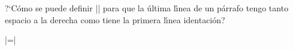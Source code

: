 


\bigskip

\enunciadoS ?`C\'omo se puede definir |\parfillskip| para que 
la \'ultima l\'{\i}nea de un p\'arrafo tengo tanto espacio a la 
derecha como tiene la primera l\'{\i}nea identaci\'on?

\bigskip

\respuesta{}

|\parfillskip=\parindent|

\bye